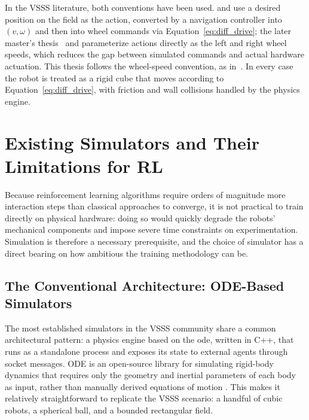 In the VSSS literature, both conventions have been used.
\textcite{tg_thiago} and \textcite{medeiros2020} use a desired position on the field as the action, converted by a
navigation controller into $(v,\omega)$ and then into wheel commands via
Equation~\eqref{eq:diff_drive}; the later master's thesis~\cite{master_thiago} and \textcite{tg_thay} parameterize actions directly as the left and right wheel speeds,
which reduces the gap between simulated commands and actual hardware actuation.  This thesis follows the wheel-speed convention, as in~\cite{brandao2022}.  In every case the robot is treated as a rigid cube that moves according to
Equation~\eqref{eq:diff_drive}, with friction and wall collisions handled by
the physics engine.

\section{Existing Simulators and Their Limitations for RL}

Because reinforcement learning algorithms require orders of magnitude more
interaction steps than classical approaches to converge, it is not practical
to train directly on physical hardware: doing so would quickly degrade the
robots' mechanical components and impose severe time constraints on
experimentation.  Simulation is therefore a necessary prerequisite, and the
choice of simulator has a direct bearing on how ambitious the training
methodology can be.

\subsection{The Conventional Architecture: ODE-Based Simulators}

The most established simulators in the VSSS community share a common
architectural pattern: a physics engine based on the \gls{ode}, written in C++,
that runs as a standalone process and exposes
its state to external agents through socket messages.  ODE is an open-source
library for simulating rigid-body dynamics that requires only the geometry and
inertial parameters of each body as input, rather than manually derived
equations of motion \cite{smith2001}.  This makes it relatively
straightforward to replicate the VSSS scenario: a handful of cubic robots, a
spherical ball, and a bounded rectangular field.

